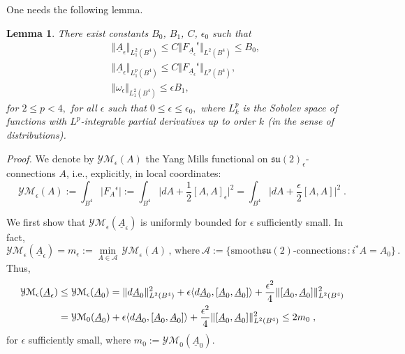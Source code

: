 \documentclass[11pt]{article}
\numberwithin{equation}{section} \setlength{\topmargin}{-35pt}
\begin{document}
One needs the following lemma.
\newtheorem{lemma}{Lemma}[section]
\begin{lemma}
\label{L2.1} There exist constants $B_0$, $B_1$, $C$, $\epsilon_0$
such that
\begin{align}
&\Vert {\underline A}_\epsilon\Vert _{L^2_1(B^4)}\leq C\Vert
{F_{\underline{A}_{\epsilon}}}^{\epsilon}\Vert_{L^2(B^4)}
\leq B_0,\\
&\Vert{\underline  A}_\epsilon\Vert _{L^p_1(B^4)}\leq C\Vert
{F_{\underline{A}_{\epsilon}}}^{\epsilon}\Vert_{L^p(B^4)},\\
&\Vert \omega_\epsilon\Vert _{L^2_1(B^4)}\leq \epsilon B_1,
\end{align}
for $2\leq p<4,$ for all $\epsilon$ such that $0\leq\epsilon\leq
\epsilon_0,$ where $L^p_k$ is the Sobolev space of functions with
$L^p$-integrable partial derivatives up to order $k$ (in the sense
of distributions).
\end{lemma}
\textit{Proof.} We denote by $\mathcal{YM}_\epsilon(A)$ the Yang
Mills functional on $\mathfrak{su}(2)_\epsilon$-connections $A$,
i.e., explicitly, in local coordinates:
\begin{equation} \label{YMepsilon}\mathcal{YM}_\epsilon(A):= \int_{B^4}\vert{F_A}^{\epsilon}\vert := \int_{B^4}\Big\vert dA
+ \frac{1}{2}[A, A]_\epsilon\Big\vert^2 = \int_{B^4}\Big\vert dA +
\frac{\epsilon}{2}[A, A]\Big\vert^2\;.\end{equation}

\noindent We first show that $\mathcal{YM}_\epsilon({\underline
A}_\epsilon)$ is uniformly bounded for $\epsilon$ sufficiently
small. In fact,
\begin{equation}
 \mathcal{YM}_\epsilon({\underline  A}_\epsilon)= m_\epsilon:= \min_{A\in \mathcal{A}}\, \mathcal{YM}_\epsilon
 (A)\,,\,
\text{where}~\mathcal{A}:= \{\text{smooth
$\mathfrak{su}(2)$-connections}\, : i^* A= A_0\}\,.
\end{equation}
Thus,
\begin{align}\mathcal{YM}_\epsilon({\underline
A}_\epsilon)&\leq \mathcal{YM}_\epsilon ({\underline   A}_0) = \Vert
d{\underline A}_0\Vert^2_{L^2(B^4)} +\epsilon\langle d{\underline
A}_0, [{\underline   A}_0, {\underline   A}_0]\rangle+\frac
{\epsilon^2}{4}
\Vert [{\underline A}_0, {\underline   A}_0]\Vert ^2_{L^2(B^4)}\notag\\
&=\mathcal {YM}_0({\underline   A}_0)+\epsilon\langle d{\underline
A}_0, [{\underline   A}_0, {\underline   A}_0]\rangle+\frac
{\epsilon^2}{4} \Vert [{\underline   A}_0, {\underline   A}_0]\Vert
^2_{L^2(B^4)}\leq 2 m_0\;,
\end{align}
for $\epsilon$ sufficiently small, where $m_0:=\mathcal
{YM}_0({\underline   A}_0).$
\end{document}
